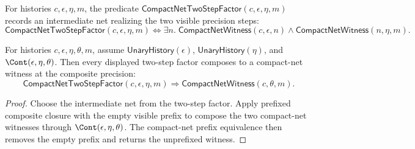 \begin{definition}
\label{def:compact-net-two-step-factor}
For histories $c,\epsilon,\eta,m$, the predicate
$\mathsf{CompactNetTwoStepFactor}(c,\epsilon,\eta,m)$ records an intermediate
net realizing the two visible precision steps:
$$
\mathsf{CompactNetTwoStepFactor}(c,\epsilon,\eta,m)
\Longleftrightarrow
\exists n.\;
\mathsf{CompactNetWitness}(c,\epsilon,n)\wedge
\mathsf{CompactNetWitness}(n,\eta,m).
$$
\end{definition}

\begin{theorem}
\label{thm:compact-net-two-step-factor-composed-closed}
For histories $c,\epsilon,\eta,\theta,m$, assume
$\mathsf{UnaryHistory}(\epsilon)$, $\mathsf{UnaryHistory}(\eta)$, and
$\Cont(\epsilon,\eta,\theta)$. Then every displayed two-step factor composes
to a compact-net witness at the composite precision:
$$
\mathsf{CompactNetTwoStepFactor}(c,\epsilon,\eta,m)
\Longrightarrow
\mathsf{CompactNetWitness}(c,\theta,m).
$$
\end{theorem}
\begin{proof}
Choose the intermediate net from the two-step factor. Apply prefixed composite
closure with the empty visible prefix to compose the two compact-net witnesses
through $\Cont(\epsilon,\eta,\theta)$. The compact-net prefix equivalence then
removes the empty prefix and returns the unprefixed witness.
\end{proof}

